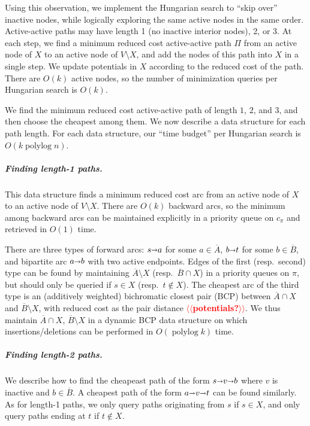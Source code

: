 \documentclass[a4paper,UKenglish]{socg-lipics-v2018}
\makeatletter
\def\polylog{\mathop{\mathrm{polylog}}}
\def\arcto{\mathord\shortrightarrow}
\def\arc#1#2{#1\arcto#2}
\theoremstyle{plain}
\numberwithin{figure}{section}
\renewcommand{\paragraph}{\subparagraph}
\def\n@te#1{\textsf{\boldmath \textbf{$\langle\!\langle$#1$\rangle\!\rangle$}}\leavevmode}
\def\note#1{\textcolor{red}{\n@te{#1}}}
\makeatother
\begin{document}
Using this observation, we implement the Hungarian search to ``skip over''
inactive nodes, while logically exploring the same active nodes in the same order.
Active-active paths may have length 1 (no inactive interior nodes), 2, or 3.
At each step, we find a minimum reduced cost active-active path $\Pi$ from an
active node of $X$ to an active node of $V \setminus X$, and add the nodes of
this path into $X$ in a single step.
We update potentials in $X$ according to the reduced cost of the path.
There are $O(k)$ active nodes, so the number of minimization queries per
Hungarian search is $O(k)$.

We find the minimum reduced cost active-active path of length $1$, $2$, and $3$,
and then choose the cheapest among them.
We now describe a data structure for each path length.
For each data structure, our ``time budget'' per Hungarian search is $O(k\polylog n)$.

\paragraph{Finding length-1 paths.}
This data structure finds a minimum reduced cost arc from an active node of
$X$ to an active node of $V \setminus X$.
There are $O(k)$ backward arcs, so the minimum among backward arcs can be
maintained explicitly in a priority queue on $c_\pi$ and retrieved in $O(1)$ time.

There are three types of forward arcs: $\arc sa$ for some $a \in \overline{A}$,
$\arc bt$ for some $b \in \overline{B}$, and bipartite arc $\arc ab$ with two
active endpoints.
Edges of the first (resp.\ second) type can be found by maintaining
$\overline{A} \setminus X$ (resp.\ $\overline{B} \cap X$) in a priority queues
on $\pi$, but should only be queried if $s \in X$ (resp.\ $t \not\in X$).
%
The cheapest arc of the third type is an (additively weighted) bichromatic
closest pair (BCP) between $\overline{A} \cap X$ and $\overline{B} \setminus X$,
with reduced cost as the pair distance \note{potentials?}.
We thus maintain $\overline{A} \cap X$, $\overline{B} \setminus X$ in a dynamic
BCP data structure \cite{KMRSS17} on which insertions/deletions can be performed
in $O(\polylog k)$ time.

\paragraph{Finding length-2 paths.}
We describe how to find the cheapeast path of the form $s \arcto v \arcto b$ where
$v$ is inactive and $b \in \overline{B}$.
A cheapest path of the form $a \arcto v \arcto t$ can be found similarly.
As for length-1 paths, we only query paths originating from $s$ if $s \in X$,
and only query paths ending at $t$ if $t \not\in X$.
\end{document}
